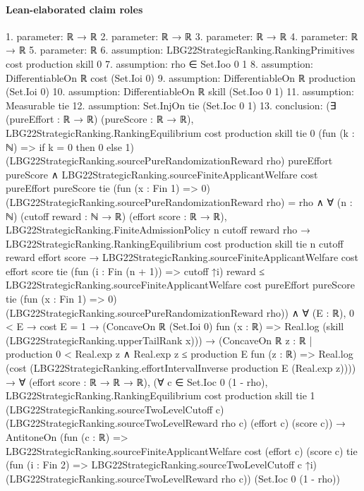 \documentclass[10pt]{article}
\begin{document}
\paragraph{Lean-elaborated claim roles}\begin{ReviewVerbatim}
1. parameter: ℝ → ℝ
2. parameter: ℝ → ℝ
3. parameter: ℝ → ℝ
4. parameter: ℝ → ℝ
5. parameter: ℝ
6. assumption: LBG22StrategicRanking.RankingPrimitives cost production skill 0
7. assumption: rho ∈ Set.Ioo 0 1
8. assumption: DifferentiableOn ℝ cost (Set.Ioi 0)
9. assumption: DifferentiableOn ℝ production (Set.Ioi 0)
10. assumption: DifferentiableOn ℝ skill (Set.Ioo 0 1)
11. assumption: Measurable tie
12. assumption: Set.InjOn tie (Set.Ioc 0 1)
13. conclusion: (∃ (pureEffort : ℝ → ℝ) (pureScore : ℝ → ℝ),
    LBG22StrategicRanking.RankingEquilibrium cost production skill tie 0 (fun (k : ℕ) => if k = 0 then 0 else 1)
        (LBG22StrategicRanking.sourcePureRandomizationReward rho) pureEffort pureScore ∧
      LBG22StrategicRanking.sourceFiniteApplicantWelfare cost pureEffort pureScore tie (fun (x : Fin 1) => 0)
            (LBG22StrategicRanking.sourcePureRandomizationReward rho) =
          rho ∧
        ∀ (n : ℕ) (cutoff reward : ℕ → ℝ) (effort score : ℝ → ℝ),
          LBG22StrategicRanking.FiniteAdmissionPolicy n cutoff reward rho →
            LBG22StrategicRanking.RankingEquilibrium cost production skill tie n cutoff reward effort score →
              LBG22StrategicRanking.sourceFiniteApplicantWelfare cost effort score tie
                  (fun (i : Fin (n + 1)) => cutoff ↑i) reward ≤
                LBG22StrategicRanking.sourceFiniteApplicantWelfare cost pureEffort pureScore tie (fun (x : Fin 1) => 0)
                  (LBG22StrategicRanking.sourcePureRandomizationReward rho)) ∧
  ∀ (E : ℝ),
    0 < E →
      cost E = 1 →
        (ConcaveOn ℝ (Set.Ioi 0) fun (x : ℝ) => Real.log (skill (LBG22StrategicRanking.upperTailRank x))) →
          (ConcaveOn ℝ {z : ℝ | production 0 < Real.exp z ∧ Real.exp z ≤ production E} fun (z : ℝ) =>
              Real.log (cost (LBG22StrategicRanking.effortIntervalInverse production E (Real.exp z)))) →
            ∀ (effort score : ℝ → ℝ → ℝ),
              (∀ c ∈ Set.Ioc 0 (1 - rho),
                  LBG22StrategicRanking.RankingEquilibrium cost production skill tie 1
                    (LBG22StrategicRanking.sourceTwoLevelCutoff c) (LBG22StrategicRanking.sourceTwoLevelReward rho c)
                    (effort c) (score c)) →
                AntitoneOn
                  (fun (c : ℝ) =>
                    LBG22StrategicRanking.sourceFiniteApplicantWelfare cost (effort c) (score c) tie
                      (fun (i : Fin 2) => LBG22StrategicRanking.sourceTwoLevelCutoff c ↑i)
                      (LBG22StrategicRanking.sourceTwoLevelReward rho c))
                  (Set.Ioc 0 (1 - rho))
\end{ReviewVerbatim}
\end{document}

